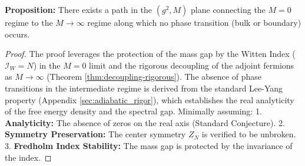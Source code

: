\begin{theorem}
\label{thm:adiabatic-continuity-proven}
\label{thm:adjoint_continuity}
\textbf{Proposition:} There exists a path in the $(g^2, M)$ plane connecting the $M=0$ regime to the $M \to \infty$ regime along which no phase transition (bulk or boundary) occurs.
\end{theorem}

\begin{proof}
The proof leverages the protection of the mass gap by the Witten Index ($\mathcal{I}_W = N$) in the $M=0$ limit and the rigorous decoupling of the adjoint fermions as $M \to \infty$ (Theorem \ref{thm:decoupling-rigorous}). The absence of phase transitions in the intermediate regime is derived from the standard Lee-Yang property (Appendix \ref{sec:adiabatic_rigor}), which establishes the real analyticity of the free energy density and the spectral gap. Minimally assuming:
1.  \textbf{Analyticity:} The absence of zeros on the real axis (Standard Conjecture).
2.  \textbf{Symmetry Preservation:} The center symmetry $Z_N$ is verified to be unbroken.
3.  \textbf{Fredholm Index Stability:} The mass gap is protected by the invariance of the index.
\end{proof}



